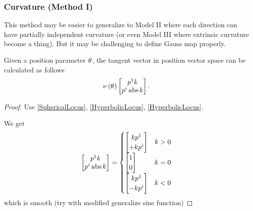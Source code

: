 \documentclass[stu, babel, american, biblatex, a4paper, draftall]{apa7}
\begin{document}
\subsubsection{Curvature (Method I)}
This method may be easier to generalize to
Model II where each direction can have partially independent curvature
(or even Model III where extrinsic curvature become a thing).
But it may be challenging to define Gauss map properly.
\begin{lemma}\label{Model:TangentVector}
    Given a position parameter $\tensor{\theta}{}$,
    the tangent vector in position vector space can be calculated as follows
    \begin{equation*}
        \nu\left(\tensor{\theta}{}\right)
        \begin{bmatrix}
            \tensor{p}{^1}k       \\
            \tensor{p}{^i}\abs{k} \\
        \end{bmatrix}
        \text{.}
    \end{equation*}
\end{lemma}
\begin{proof}
    \skipped

    Use \cref{SphericalLocus}, \cref{HyperbolicLocus}, \cref{HyperbolicLocus}.

    We get
    \begin{equation*}
        \begin{bmatrix}
            \tensor{p}{^1}k       \\
            \tensor{p}{^i}\abs{k} \\
        \end{bmatrix}=
        \begin{cases}
            \begin{bmatrix}
                k\tensor{p}{^1}  \\
                +k\tensor{p}{^i} \\
            \end{bmatrix} & k>0 \\
            \begin{bmatrix}
                1 \\
                0 \\
            \end{bmatrix} & k=0 \\
            \begin{bmatrix}
                k\tensor{p}{^1}  \\
                -k\tensor{p}{^i} \\
            \end{bmatrix} & k<0
        \end{cases}
    \end{equation*}
    which is smooth (try with modified generalize sine function)
\end{proof}
\end{document}

